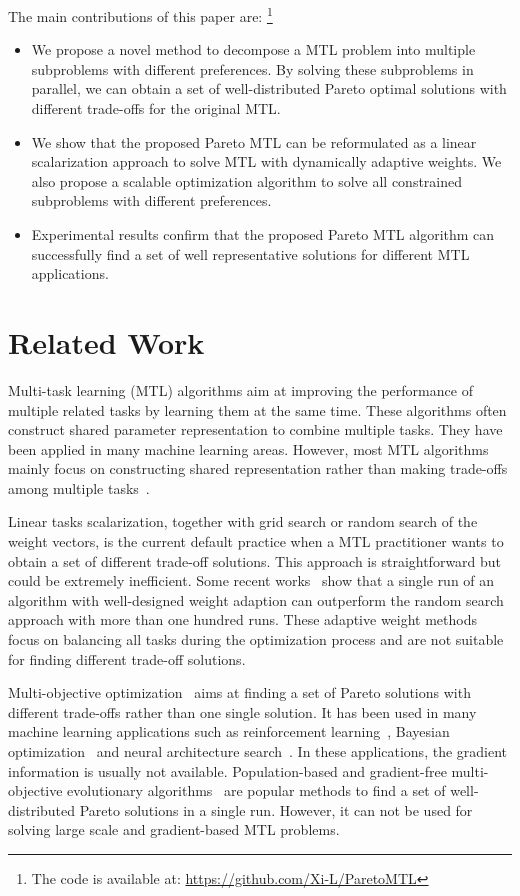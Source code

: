 The main contributions of this paper are: \footnote{The code is available at: \url{https://github.com/Xi-L/ParetoMTL}}

\begin{itemize}
\item We propose a novel method to decompose a MTL problem into multiple subproblems with different preferences. By solving these subproblems in parallel, we can obtain a set of well-distributed Pareto optimal solutions with different trade-offs for the original MTL.
\item We show that the proposed Pareto MTL can be reformulated as a linear scalarization approach to solve MTL with dynamically adaptive weights. We also propose a scalable optimization algorithm to solve all constrained subproblems with different preferences.
\item Experimental results confirm that the proposed Pareto MTL algorithm can successfully find a set of well representative solutions for different MTL applications.
\end{itemize}

\section{Related Work}

Multi-task learning (MTL) algorithms aim at improving the performance of multiple related tasks by learning them at the same time. These algorithms often construct shared parameter representation to combine multiple tasks. They have been applied in many machine learning areas. However, most MTL algorithms mainly focus on constructing shared representation rather than making trade-offs among multiple tasks~\cite{ruder2017overview,zhang2017survey}.

Linear tasks scalarization, together with grid search or random search of the weight vectors, is the current default practice when a MTL practitioner wants to obtain a set of different trade-off solutions. This approach is straightforward but could be extremely inefficient. Some recent works~\cite{kendall2017multi,chen2018grad} show that a single run of an algorithm with well-designed weight adaption can outperform the random search approach with more than one hundred runs. These adaptive weight methods focus on balancing all tasks during the optimization process and are not suitable for finding different trade-off solutions.

Multi-objective optimization~\cite{miettinen2012nonlinear} aims at finding a set of Pareto solutions with different trade-offs rather than one single solution. It has been used in many machine learning applications such as reinforcement learning~\cite{van2014multi}, Bayesian optimization~\cite{zuluaga2013active,hernandez2016predictive,shah2016pareto} and neural architecture search~\cite{dong2018dpp,elsken2018efficient}. In these applications, the gradient information is usually not available. Population-based and gradient-free multi-objective evolutionary algorithms~\cite{zitzler1999evolutionary, Deb2001} are popular methods to find a set of well-distributed Pareto solutions in a single run. However, it can not be used for solving large scale and gradient-based MTL problems.

